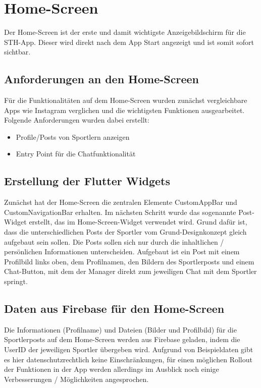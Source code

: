 \chapter{Home-Screen}
Der Home-Screen ist der erste und damit wichtigste Anzeigebildschirm für die STH-App. 
Dieser wird direkt nach dem App Start angezeigt und ist somit sofort sichtbar.
\section{Anforderungen an den Home-Screen}
Für die Funktionalitäten auf dem Home-Screen wurden zunächst vergleichbare Apps wie Instagram verglichen und die wichtigsten Funktionen ausgearbeitet.\newline
Folgende Anforderungen wurden dabei erstellt:
\begin{itemize}
    \item Profile/Posts von Sportlern anzeigen
    \item Entry Point für die Chatfunktionalität
\end{itemize}

\section{Erstellung der Flutter Widgets}
Zunächst hat der Home-Screen die zentralen Elemente CustomAppBar und CustomNavigationBar erhalten.
Im nächsten Schritt wurde das sogenannte Post-Widget erstellt, das im Home-Screen-Widget verwendet wird.
Grund dafür ist, dass die unterschiedlichen Posts der Sportler vom Grund-Designkonzept gleich aufgebaut sein sollen. 
Die Posts sollen sich nur durch die inhaltlichen / persönlichen Informationen unterscheiden.\newline
Aufgebaut ist ein Post mit einem Profilbild links oben, dem Profilnamen, den Bildern des Sportlerposts und einem Chat-Button, mit dem der Manager direkt zum jeweiligen Chat mit dem Sportler springt.

\section{Daten aus Firebase für den Home-Screen}
Die Informationen (Profilname) und Dateien (Bilder und Profilbild) für die Sportlerposts auf dem Home-Screen werden aus Firebase geladen, indem die UserID der jeweiligen Sportler übergeben wird.
Aufgrund von Beispieldaten gibt es hier datenschutzrechtlich keine Einschränkungen, für einen möglichen Rollout der Funktionen in der App werden allerdings im Ausblick noch einige Verbesserungen / Möglichkeiten angesprochen.

